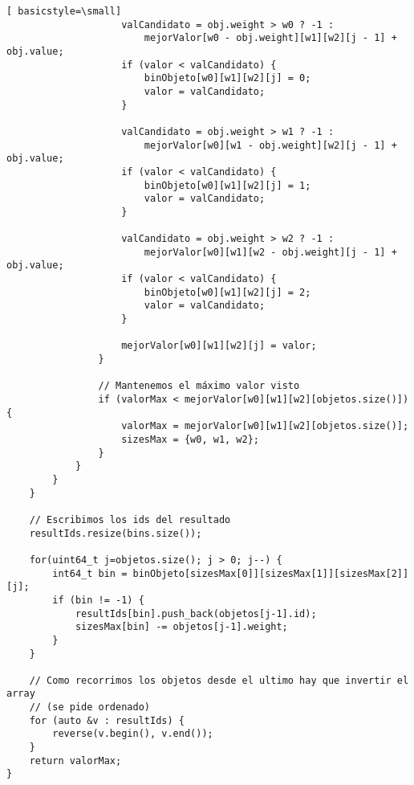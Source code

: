 \begin{lstlisting}[ basicstyle=\small]
                    valCandidato = obj.weight > w0 ? -1 :
                        mejorValor[w0 - obj.weight][w1][w2][j - 1] + obj.value;
                    if (valor < valCandidato) {
                        binObjeto[w0][w1][w2][j] = 0;
                        valor = valCandidato;
                    }

                    valCandidato = obj.weight > w1 ? -1 :
                        mejorValor[w0][w1 - obj.weight][w2][j - 1] + obj.value;
                    if (valor < valCandidato) {
                        binObjeto[w0][w1][w2][j] = 1;
                        valor = valCandidato;
                    }

                    valCandidato = obj.weight > w2 ? -1 :
                        mejorValor[w0][w1][w2 - obj.weight][j - 1] + obj.value;
                    if (valor < valCandidato) {
                        binObjeto[w0][w1][w2][j] = 2;
                        valor = valCandidato;
                    }

                    mejorValor[w0][w1][w2][j] = valor;
                }

                // Mantenemos el máximo valor visto
                if (valorMax < mejorValor[w0][w1][w2][objetos.size()]) {
                    valorMax = mejorValor[w0][w1][w2][objetos.size()];
                    sizesMax = {w0, w1, w2};
                }
            }
        }
    }

    // Escribimos los ids del resultado
    resultIds.resize(bins.size());

    for(uint64_t j=objetos.size(); j > 0; j--) {
        int64_t bin = binObjeto[sizesMax[0]][sizesMax[1]][sizesMax[2]][j];
        if (bin != -1) {
            resultIds[bin].push_back(objetos[j-1].id);
            sizesMax[bin] -= objetos[j-1].weight;
        }
    }

    // Como recorrimos los objetos desde el ultimo hay que invertir el array
    // (se pide ordenado)
    for (auto &v : resultIds) {
        reverse(v.begin(), v.end());
    }
    return valorMax;
}
\end{lstlisting}
